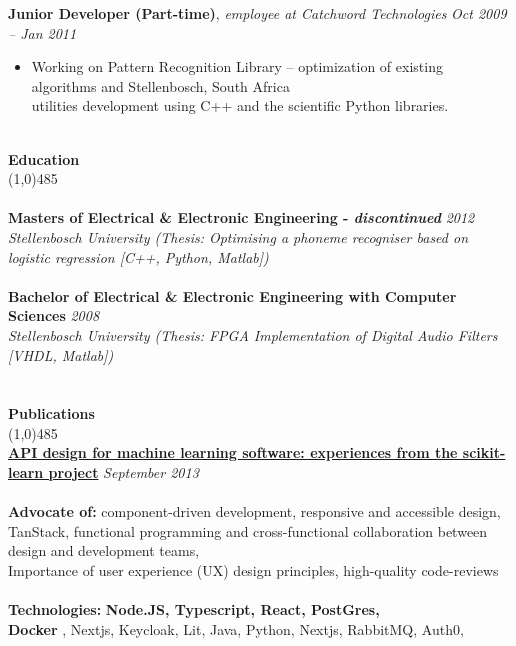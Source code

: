 \documentclass[9pt]{extarticle}
\newcommand\tab[1][1cm]{\hspace*{#1}}
\newcommand\smallspace[1][0.23cm]{\hspace*{#1}}
\newcommand\negativespace[1][-0.12cm]{\hspace*{#1}}
\begin{document}
\noindent
{\bf Junior Developer (Part-time)}, \textit{employee at Catchword Technologies}  \hfill \textit{Oct 2009 -- Jan 2011}
\begin{itemize}
\setlength\itemsep{0.05em}

\item Working on Pattern Recognition Library – optimization of existing algorithms and \hfill Stellenbosch, South Africa \\
utilities development using C++ and the scientific Python libraries.

\end{itemize}

\noindent %
\\
\vspace*{-6pt}
{\negativespace \Large \bf Education}\\
\line(1,0){485}\\
\\
\noindent
{\bf Masters of Electrical & Electronic Engineering - \textit{discontinued}} \hfill \textit{2012} \\
\textit{Stellenbosch University (Thesis: Optimising a phoneme recogniser based on logistic regression [C++, Python, Matlab])} \\\\
\noindent
{\bf Bachelor of Electrical & Electronic Engineering with Computer Sciences} \hfill \textit{2008} \\
\textit{Stellenbosch University (Thesis: FPGA Implementation of Digital Audio Filters [VHDL, Matlab])} \\
\\
\\
\vspace*{-6pt}
{\negativespace \Large \bf Publications}\\
\line(1,0){485}\\
{\bf \href{https://paperswithcode.com/paper/api-design-for-machine-learning-software}{API design for machine learning software: experiences from the scikit-learn project}} \hfill \textit{September 2013} \\
\\

\noindent
{\bf Advocate of:} component-driven development, responsive and accessible design, TanStack, functional programming and
\tab \tab cross-functional collaboration between design and development teams,\\
\tab \tab Importance of user experience (UX) design principles, high-quality code-reviews\\ \\
\noindent
{\bf Technologies:} \textbf{Node.JS, Typescript, React, PostGres, \\
\tab \tab \smallspace  Docker }, Nextjs, Keycloak, Lit, Java, Python, Nextjs, RabbitMQ, Auth0, \\
\end{document}
